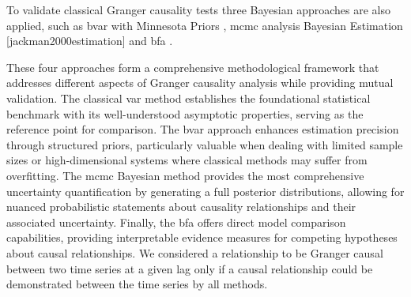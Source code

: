 \documentclass[preprint, 3p,
authoryear]{elsarticle} %
\begin{document}
To validate classical Granger causality tests three Bayesian approaches
are also applied, such as \gls{bvar} with Minnesota Priors
\citep{ni2003noninformative}, \gls{mcmc} analysis Bayesian Estimation
{[}jackman2000estimation{]} and \gls{bfa}
\citep{oravecz2024quantifying}.

These four approaches form a comprehensive methodological framework that
addresses different aspects of Granger causality analysis while
providing mutual validation. The classical \gls{var} method establishes
the foundational statistical benchmark with its well-understood
asymptotic properties, serving as the reference point for comparison.
The \gls{bvar} approach enhances estimation precision through structured
priors, particularly valuable when dealing with limited sample sizes or
high-dimensional systems where classical methods may suffer from
overfitting. The \gls{mcmc} Bayesian method provides the most
comprehensive uncertainty quantification by generating a full posterior
distributions, allowing for nuanced probabilistic statements about
causality relationships and their associated uncertainty. Finally, the
\gls{bfa} offers direct model comparison capabilities, providing
interpretable evidence measures for competing hypotheses about causal
relationships. We considered a relationship to be Granger causal between
two time series at a given lag only if a causal relationship could be
demonstrated between the time series by all methods.
\end{document}
